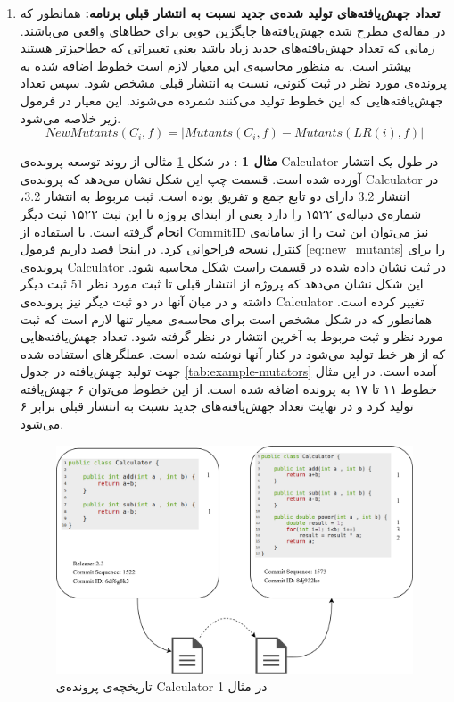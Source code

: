 \begin{enumerate}
	\item  
	\textbf{
		تعداد جهش‌یافته‌های تولید شده‌ی جدید نسبت به انتشار قبلی برنامه: }همانطور که در مقاله‌ی \cite{just2014mutants} مطرح شده جهش‌یافته‌ها جایگزین خوبی برای خطاهای واقعی می‌باشند. زمانی که تعداد جهش‌یافته‌های جدید زیاد باشد یعنی تغییراتی که خطا‌خیز‌تر هستند بیشتر است. به منظور محاسبه‌ی این معیار لازم است خطوط اضافه شده به پرونده‌ی مورد نظر در ثبت کنونی، نسبت به انتشار قبلی مشخص شود. سپس تعداد جهش‌یافته‌هایی که این خطوط تولید می‌کنند شمرده می‌شوند. این معیار در فرمول زیر خلاصه می‌شود.
\begin{equation} \label{eq:new_mutants}
NewMutants(C_i,f) = | Mutants(C_i,f) - Mutants(LR(i),f)|
\end{equation}

	
\textbf{مثال 1} : 
در شکل \ref{fig:example1} مثالی  از روند توسعه پرونده‌ی  Calculator در طول یک انتشار آورده شده است. قسمت چپ این شکل نشان می‌دهد که پرونده‌ی Calculator در انتشار 3.2 دارای دو تابع جمع و تفریق بوده است. ثبت مربوط به انتشار 3.2،  شماره‌ی دنباله‌ی ۱۵۲۲ را دارد یعنی از ابتدای پروژه تا این ثبت ۱۵۲۲ ثبت دیگر انجام گرفته است. با استفاده از CommitID نیز می‌توان این ثبت را از سامانه‌ی کنترل نسخه فراخوانی کرد. در اینجا قصد داریم فرمول  \ref{eq:new_mutants}  را برای  پرونده‌ی  Calculator در ثبت نشان داده شده در قسمت راست شکل محاسبه  شود. این شکل نشان می‌دهد که پروژه از انتشار قبلی تا ثبت مورد نظر 51 ثبت دیگر داشته و در میان  آنها در دو ثبت دیگر نیز پرونده‌ی Calculator تغییر کرده است. 
 همانطور که در شکل مشخص است برای محاسبه‌ی معیار تنها لازم است که ثبت مورد نظر و ثبت مربوط به آخرین انتشار در نظر گرفته شود. تعداد جهش‌یافته‌هایی که از هر خط تولید می‌شود در کنار آنها نوشته شده است. عملگرهای استفاده شده جهت تولید جهش‌یافته در جدول  \ref{tab:example-mutators} آمده است. در این مثال خطوط ۱۱ تا ۱۷ به پرونده اضافه شده است. از این خطوط می‌توان ۶ جهش‌یافته تولید کرد و در نهایت تعداد جهش‌یافته‌های جدید نسبت به انتشار قبلی برابر ۶ می‌شود. 

\begin{figure}[H]
	\centering
	\includegraphics[width=1\textwidth]{img/method/example1.png}
	\caption{ تاریخچه‌ی پرونده‌ی Calculator در مثال 1}
	\label{fig:example1}
\end{figure}




\end{enumerate}

